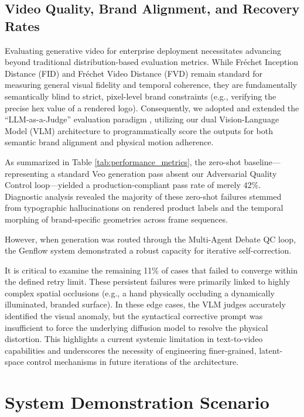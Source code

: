 \documentclass[sigconf,authordraft]{acmart}
\begin{document}
\subsection{Video Quality, Brand Alignment, and Recovery Rates}

Evaluating generative video for enterprise deployment necessitates advancing beyond traditional distribution-based evaluation metrics. While Fréchet Inception Distance (FID) \cite{heusel2017gans} and Fréchet Video Distance (FVD) \cite{unterthiner2018towards} remain standard for measuring general visual fidelity and temporal coherence, they are fundamentally semantically blind to strict, pixel-level brand constraints (e.g., verifying the precise hex value of a rendered logo). Consequently, we adopted and extended the ``LLM-as-a-Judge'' evaluation paradigm \cite{zheng2023judging}, utilizing our dual Vision-Language Model (VLM) architecture to programmatically score the outputs for both semantic brand alignment and physical motion adherence.

As summarized in Table \ref{tab:performance_metrics}, the zero-shot baseline---representing a standard Veo generation pass absent our Adversarial Quality Control loop---yielded a production-compliant pass rate of merely 42\%. Diagnostic analysis revealed the majority of these zero-shot failures stemmed from typographic hallucinations on rendered product labels and the temporal morphing of brand-specific geometries across frame sequences.

However, when generation was routed through the Multi-Agent Debate QC loop, the Genflow system demonstrated a robust capacity for iterative self-correction.

It is critical to examine the remaining 11\% of cases that failed to converge within the defined retry limit. These persistent failures were primarily linked to highly complex spatial occlusions (e.g., a hand physically occluding a dynamically illuminated, branded surface). In these edge cases, the VLM judges accurately identified the visual anomaly, but the syntactical corrective prompt was insufficient to force the underlying diffusion model to resolve the physical distortion. This highlights a current systemic limitation in text-to-video capabilities and underscores the necessity of engineering finer-grained, latent-space control mechanisms in future iterations of the architecture.

\section{System Demonstration Scenario}
\end{document}

